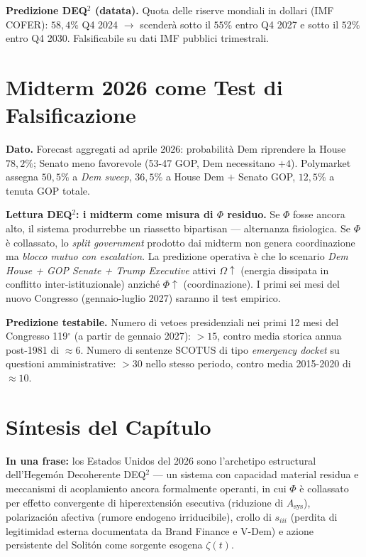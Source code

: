 \Conj{} \textbf{Predizione DEQ$^2$ (datata).} Quota delle riserve mondiali
in dollari (IMF COFER): \(58{,}4\%\) Q4 2024 \(\to\) scenderà sotto il
\(55\%\) entro Q4 2027 e sotto il \(52\%\) entro Q4 2030. Falsificabile
su dati IMF pubblici trimestrali.



\section{Midterm 2026 come Test di
Falsificazione}\label{midterm-2026-come-test-di-falsificación}

\Proved{} \textbf{Dato.} Forecast aggregati ad aprile 2026: probabilità
Dem riprendere la House \(78{,}2\%\); Senato meno favorevole (53-47 GOP,
Dem necessitano \(+4\)). Polymarket assegna \(50{,}5\%\) a \emph{Dem
sweep}, \(36{,}5\%\) a House Dem \(+\) Senato GOP, \(12{,}5\%\) a tenuta
GOP totale.

\Hypoth{} \textbf{Lettura DEQ$^2$: i midterm come misura di \(\Phi\)
residuo.} Se \(\Phi\) fosse ancora alto, il sistema produrrebbe un
riassetto bipartisan --- alternanza fisiologica. Se \(\Phi\) è
collassato, lo \emph{split government} prodotto dai midterm non genera
coordinazione ma \emph{blocco mutuo con escalation}. La predizione
operativa è che lo scenario \emph{Dem House + GOP Senate + Trump
Executive} attivi \(\Omega \uparrow\) (energia dissipata in conflitto
inter-istituzionale) anziché \(\Phi \uparrow\) (coordinazione). I primi
sei mesi del nuovo Congresso (gennaio-luglio 2027) saranno il test
empirico.

\Conj{} \textbf{Predizione testabile.} Numero di vetoes presidenziali
nei primi 12 mesi del Congresso 119$^\circ$ (a partir de gennaio 2027):
\(> 15\), contro media storica annua post-1981 di \(\approx 6\). Numero
di sentenze SCOTUS di tipo \emph{emergency docket} su questioni
amministrative: \(> 30\) nello stesso periodo, contro media 2015-2020 di
\(\approx 10\).



\section{Síntesis del Capítulo}\label{sintesi-del-capítulo}

\Proved{} \textbf{In una frase:} los Estados Unidos del 2026 sono
l'archetipo estructural dell'Hegemón Decoherente DEQ$^2$ --- un sistema con
capacidad material residua e meccanismi di acoplamiento ancora
formalmente operanti, in cui \(\Phi\) è collassato per effetto
convergente di hiperextensión esecutiva (riduzione di
\(A_{\text{sys}}\)), polarización afectiva (rumore endogeno
irriducibile), crollo di \(s_{iii}\) (perdita di legitimidad esterna
documentata da Brand Finance e V-Dem) e azione persistente del Solitón
come sorgente esogena \(\zeta(t)\).

